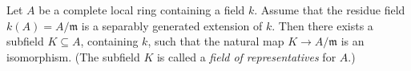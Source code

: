 Let $A$ be a complete local ring containing a field $k$. Assume that the residue field $k(A) = A/\mathfrak{m}$ is a separably generated extension of $k$. Then there exists a subfield $K \subseteq A$, containing $k$, such that the natural map $K \to A/\mathfrak{m}$ is an isomorphism. (The subfield $K$ is called a \emph{field of representatives} for $A$.)
